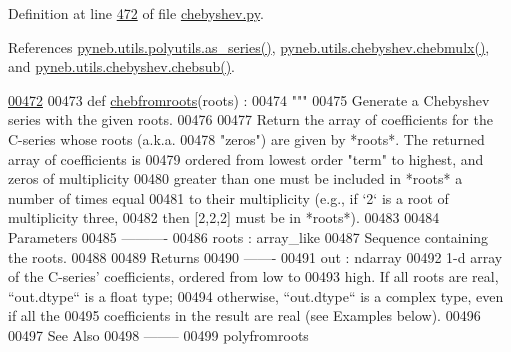 Definition at line \hyperlink{chebyshev_8py_source_l00472}{472} of file \hyperlink{chebyshev_8py_source}{chebyshev.\-py}.



References \hyperlink{polyutils_8py_source_l00115}{pyneb.\-utils.\-polyutils.\-as\-\_\-series()}, \hyperlink{chebyshev_8py_source_l00637}{pyneb.\-utils.\-chebyshev.\-chebmulx()}, and \hyperlink{chebyshev_8py_source_l00584}{pyneb.\-utils.\-chebyshev.\-chebsub()}.


\begin{DoxyCode}
\hypertarget{namespacepyneb_1_1utils_1_1chebyshev_l00472}{}\hyperlink{namespacepyneb_1_1utils_1_1chebyshev_ad3dc62fdecc545593e36509daa1c2632}{00472} 
00473 \textcolor{keyword}{def }\hyperlink{namespacepyneb_1_1utils_1_1chebyshev_ad3dc62fdecc545593e36509daa1c2632}{chebfromroots}(roots) :
00474     \textcolor{stringliteral}{"""}
00475 \textcolor{stringliteral}{    Generate a Chebyshev series with the given roots.}
00476 \textcolor{stringliteral}{}
00477 \textcolor{stringliteral}{    Return the array of coefficients for the C-series whose roots (a.k.a.}
00478 \textcolor{stringliteral}{    "zeros") are given by *roots*.  The returned array of coefficients is}
00479 \textcolor{stringliteral}{    ordered from lowest order "term" to highest, and zeros of multiplicity}
00480 \textcolor{stringliteral}{    greater than one must be included in *roots* a number of times equal}
00481 \textcolor{stringliteral}{    to their multiplicity (e.g., if `2` is a root of multiplicity three,}
00482 \textcolor{stringliteral}{    then [2,2,2] must be in *roots*).}
00483 \textcolor{stringliteral}{}
00484 \textcolor{stringliteral}{    Parameters}
00485 \textcolor{stringliteral}{    ----------}
00486 \textcolor{stringliteral}{    roots : array\_like}
00487 \textcolor{stringliteral}{        Sequence containing the roots.}
00488 \textcolor{stringliteral}{}
00489 \textcolor{stringliteral}{    Returns}
00490 \textcolor{stringliteral}{    -------}
00491 \textcolor{stringliteral}{    out : ndarray}
00492 \textcolor{stringliteral}{        1-d array of the C-series' coefficients, ordered from low to}
00493 \textcolor{stringliteral}{        high.  If all roots are real, ``out.dtype`` is a float type;}
00494 \textcolor{stringliteral}{        otherwise, ``out.dtype`` is a complex type, even if all the}
00495 \textcolor{stringliteral}{        coefficients in the result are real (see Examples below).}
00496 \textcolor{stringliteral}{}
00497 \textcolor{stringliteral}{    See Also}
00498 \textcolor{stringliteral}{    --------}
00499 \textcolor{stringliteral}{    polyfromroots}

\end{DoxyCode}
